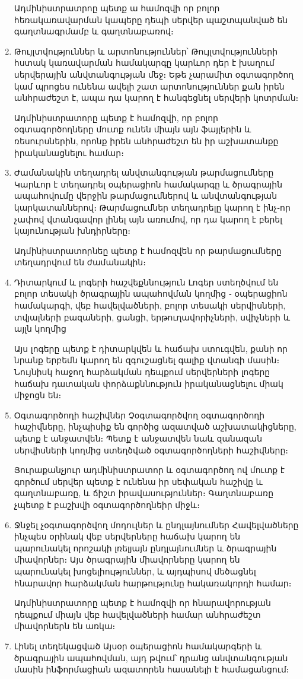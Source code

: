\documentclass[11pt]{article}
\begin{document}
\begin{sloppypar}
\begin{enumerate}
    Ադմինիստրատրոը պետք ա համոզվի որ բոլոր հեռակառավարման կապերը
    դեպի սերվեր պաշտպանված են գաղտնագրմամբ և գաղտնաբառով։
\item Թույլտվություններ և արտոնություններ՝
    Թույլտվությունների հստակ կառավարման համակարգը կարևոր դեր է խաղում
    սերվերային անվտանգության մեջ։ Եթե չարամիտ օգտագործող կամ պրոցես
    ունենա ավելի շատ արտոնություններ քան իրեն անհրաժեշտ է, ապա դա
    կարող է հանգեցնել սերվերի կոտրման։

    Ադմինիստրատորը պետք է համոզվի, որ բոլոր օգտագործողները մուտք ունեն
    միայն այն ֆայլերին և ռեսուրսներին, որոնք իրեն անհրաժեշտ են իր
    աշխատանքը իրականացնելու համար։
\item Ժամանակին տեղադրել անվտանգության թարմացումները
    Կարևոր է տեղադրել օպերացիոն համակարգը և ծրագրային ապահովումը
    վերջին թարմացումներով և անվտանգության կարկատաններով։
    Թարմացումներ տեղադրելը կարող է ինչ֊որ չափով վտանգավոր լինել
    այն առումով, որ դա կարող է բերել կայունության խնդիրները։

    Ադմինիստրատորնեը պետք է համոզվեն որ թարմացումները տեղադրվում են
    ժամանակին։
\item Դիտարկում և լոգերի հաշվեքննություն
    Լոգեր ստեղծվում են բոլոր տեսակի ծրագրային ապահովման կողմից ֊
    օպերացիոն համակարգի, վեբ հավելվածների, բոլոր տեսակի սերվիսների,
    տվյալների բազաների, ցանցի, երթուղավորիչների, սվիչների և այլն կողմից

    Այս լոգերը պետք է դիտարկվեն և հաճախ ստուգվեն, քանի որ նրանք երբեմն
    կարող են զգուշացնել գալիք վտանգի մասին։ Նույնիսկ հաջող հարձակման
    դեպքում սերվերների լոգերը հաճախ դատական փորձաքննություն
    իրականացնելու միակ միջոցն են։
\item Օգտագործողի հաշիվներ
    Չօգտագործվող օգտագործողի հաշիվները, ինչպիսիք են գործից ազատված
    աշխատակիցները, պետք է անջատվեն։ Պետք է անջատվեն նաև զանազան
    սերվիսների կողմից ստեղծված օգտագործողների հաշիվները։

    Յուրաքանչյուր ադմինիստրատոր և օգտագործող ով մուտք է գործում
    սերվեր պետք է ունենա իր սեփական հաշիվը և գաղտնաբառը, և ճիշտ
    իրավասություններ։ Գաղտնաբառը չպետք է բաշխվի օգտագործողնեիր միջև։
\item Ջնջել չօգտագործվող մոդուլներ և ընդլայնումներ
    Հավելվածները ինչպես օրինակ վեբ սերվերները հաճախ կարող են պարունակել
    որոշակի լռելյայն ընդլայնումներ և ծրագրային միավորներ։
    Այս ծրագրային միավորները կարող են պարունակել խոցելիություններ, և
    այդպիսով մեծացնել հնարավոր հարձակման հարթությունը հակառակորդի համար։

    Ադմինիստրատորը պետք է համոզվի որ հնարավորության դեպքում միայն
    վեբ հավելվածների համար անհրաժեշտ միավորներն են առկա։
\item Լինել տեղեկացված
    Այսօր օպերացիոն համակարգերի և ծրագրային ապահովման,
    այդ թվում՝ դրանց անվտանգության մասին ինֆորմացիան ազատորեն հասանելի է
    համացանցում։


\end{enumerate}
\end{sloppypar}
\end{document}
